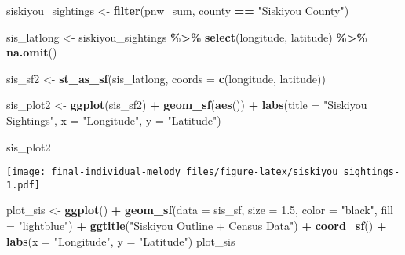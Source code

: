 \documentclass[
]{article}
\newenvironment{Shaded}{\begin{snugshade}}{\end{snugshade}}
\newcommand{\AttributeTok}[1]{\textcolor[rgb]{0.13,0.29,0.53}{#1}}
\newcommand{\FloatTok}[1]{\textcolor[rgb]{0.00,0.00,0.81}{#1}}
\newcommand{\FunctionTok}[1]{\textcolor[rgb]{0.13,0.29,0.53}{\textbf{#1}}}
\newcommand{\NormalTok}[1]{#1}
\newcommand{\OtherTok}[1]{\textcolor[rgb]{0.56,0.35,0.01}{#1}}
\newcommand{\SpecialCharTok}[1]{\textcolor[rgb]{0.81,0.36,0.00}{\textbf{#1}}}
\newcommand{\StringTok}[1]{\textcolor[rgb]{0.31,0.60,0.02}{#1}}
\begin{document}
\begin{Shaded}
\begin{Highlighting}[]
\NormalTok{siskiyou\_sightings }\OtherTok{\textless{}{-}} \FunctionTok{filter}\NormalTok{(pnw\_sum, county }\SpecialCharTok{==} \StringTok{"Siskiyou County"}\NormalTok{)}

\NormalTok{sis\_latlong }\OtherTok{\textless{}{-}}\NormalTok{ siskiyou\_sightings }\SpecialCharTok{\%\textgreater{}\%} \FunctionTok{select}\NormalTok{(longitude, latitude) }\SpecialCharTok{\%\textgreater{}\%} \FunctionTok{na.omit}\NormalTok{()}

\NormalTok{sis\_sf2 }\OtherTok{\textless{}{-}} \FunctionTok{st\_as\_sf}\NormalTok{(sis\_latlong, }\AttributeTok{coords =} \FunctionTok{c}\NormalTok{(}\StringTok{\textquotesingle{}longitude\textquotesingle{}}\NormalTok{, }\StringTok{\textquotesingle{}latitude\textquotesingle{}}\NormalTok{))}

\NormalTok{sis\_plot2 }\OtherTok{\textless{}{-}} \FunctionTok{ggplot}\NormalTok{(sis\_sf2) }\SpecialCharTok{+} 
  \FunctionTok{geom\_sf}\NormalTok{(}\FunctionTok{aes}\NormalTok{()) }\SpecialCharTok{+} \FunctionTok{labs}\NormalTok{(}\AttributeTok{title =} \StringTok{"Siskiyou Sightings"}\NormalTok{, }\AttributeTok{x =} \StringTok{"Longitude"}\NormalTok{, }\AttributeTok{y =} \StringTok{"Latitude"}\NormalTok{)}

\NormalTok{sis\_plot2}
\end{Highlighting}
\end{Shaded}

\texttt{[image: final-individual-melody\_files/figure-latex/siskiyou sightings-1.pdf]}

\begin{Shaded}
\begin{Highlighting}[]
\NormalTok{plot\_sis }\OtherTok{\textless{}{-}} \FunctionTok{ggplot}\NormalTok{() }\SpecialCharTok{+} 
  \FunctionTok{geom\_sf}\NormalTok{(}\AttributeTok{data =}\NormalTok{ sis\_sf, }\AttributeTok{size =} \FloatTok{1.5}\NormalTok{, }\AttributeTok{color =} \StringTok{"black"}\NormalTok{, }\AttributeTok{fill =} \StringTok{"lightblue"}\NormalTok{) }\SpecialCharTok{+} 
  \FunctionTok{ggtitle}\NormalTok{(}\StringTok{"Siskiyou Outline + Census Data"}\NormalTok{) }\SpecialCharTok{+} 
  \FunctionTok{coord\_sf}\NormalTok{() }\SpecialCharTok{+} \FunctionTok{labs}\NormalTok{(}\AttributeTok{x =} \StringTok{"Longitude"}\NormalTok{, }\AttributeTok{y =} \StringTok{"Latitude"}\NormalTok{)}
\NormalTok{plot\_sis}
\end{Highlighting}
\end{Shaded}
\end{document}
